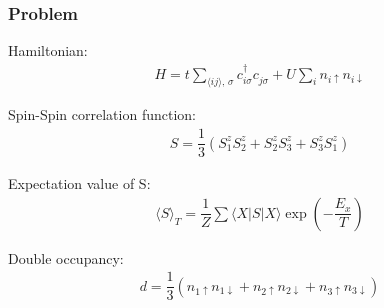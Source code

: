 \documentclass{beamer}
\begin{document}
\begin{frame}\frametitle{Problem}
Hamiltonian:
	\begin{align}
		H = t \sum_{\langle ij \rangle, \, \sigma} c_{i \sigma}^\dagger c_{j \sigma}^{} + U \sum_{i} n_{i \uparrow} n_{i \downarrow}
	\end{align}

Spin-Spin correlation function:
	\begin{align}
		S = \dfrac{1}{3} \left( S_{1}^{z}S_{2}^{z}  + S_{2}^{z} S_{3}^{z} + S_{3}^{z} S_{1}^{z}  \right)
	\end{align}

Expectation value of S:
	\begin{align}
		\langle S \rangle_T = \dfrac{1}{Z} \sum \langle X | S | X \rangle \exp \left( - \dfrac{E_x}{T} \right)
	\end{align}

Double occupancy:
	\begin{align}
		d = \dfrac{1}{3} \left( n_{1 \uparrow} n_{1 \downarrow} + n_{2 \uparrow} n_{2 \downarrow} + n_{3 \uparrow} n_{3 \downarrow} \right)	
	\end{align}
\end{frame}

\end{document}
